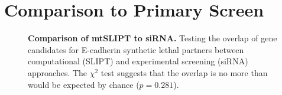\clearpage
\section{Comparison to Primary Screen}

\begin{figure}[!ht]
\begin{mdframed}
  \centering
    \caption[Comparison of mtSLIPT to siRNA]{\small \textbf{Comparison of mtSLIPT to siRNA.} Testing the overlap of gene candidates for E-cadherin synthetic lethal partners between computational (SLIPT) and experimental screening (siRNA) approaches. The $\chi^2$ test suggests that the overlap is no more than would be expected by chance ($p = 0.281$). %
}
\label{fig:Venn_allgenes_mtSL}
\end{mdframed}
\end{figure}


